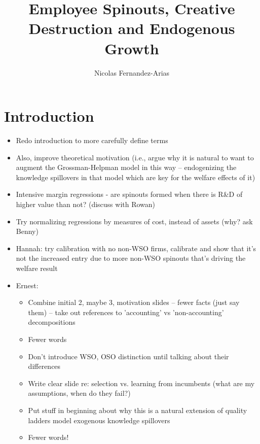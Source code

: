 \documentclass[english,usenames,dvipsnames]{beamer}
\title{Employee Spinouts, Creative Destruction and Endogenous Growth}
\author{Nicolas Fernandez-Arias}
\begin{document}
\maketitle

\section{Introduction}

\begin{frame}
\begin{itemize}
	\footnotesize
	\item Redo introduction to more carefully define terms
	\item Also, improve theoretical motivation (i.e., argue why it is natural to want to augment the Grossman-Helpman model in this way -- endogenizing the knowledge spillovers in that model which are key for the welfare effects of it)
	\item Intensive margin regressions - are spinouts formed when there is R\&D of higher value than not? (discuss with Rowan)
	\item Try normalizing regressions by measures of cost, instead of assets (why? ask Benny)
	\item Hannah: try calibration with no non-WSO firms, calibrate and show that it's not the increased entry due to more non-WSO spinouts that's driving the welfare result
	\item Ernest: 
	\begin{itemize}
		\footnotesize
		\item Combine initial 2, maybe 3, motivation slides -- fewer facts (just say them) -- take out references to 'accounting' vs 'non-accounting' decompositions
		\item Fewer words
		\item Don't introduce WSO, OSO distinction until talking about their differences
		\item Write clear slide re: selection vs. learning from incumbents (what are my assumptions, when do they fail?)
		\item Put stuff in beginning about why this is a natural extension of quality ladders model exogenous knowledge spillovers
		\item Fewer words!
	\end{itemize}
\end{itemize}
\end{frame}
\end{document}
